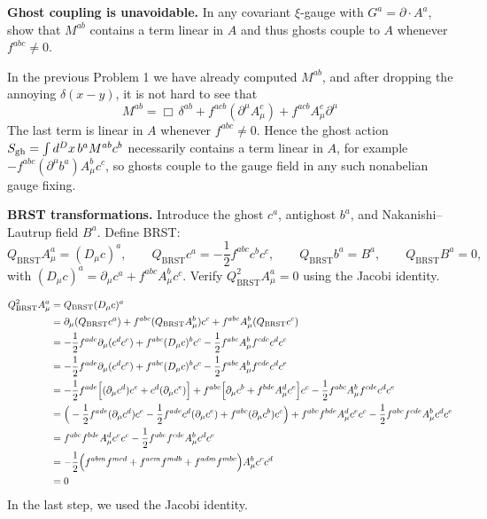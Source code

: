 \begin{problem}
    \textbf{Ghost coupling is unavoidable.} In any covariant \(\xi\)-gauge with \(G^a=\partial\cdot A^a\), show that \(M^{ab}\) contains a term linear in \(A\) and thus ghosts couple to \(A\) whenever \(f^{abc}\neq 0\).
\end{problem}
\begin{solution}[35.3]
	In the previous Problem 1 we have already computed $M^{ab}$, and after dropping the annoying $\delta(x-y)$, it is not hard to see that
	\[
		\boxed{
		M^{ab}
		= \Box\,\delta^{ab} + f^{acb}(\partial^\mu A_\mu^c) + f^{acb}A_\mu^c\partial^\mu }
	\]
	The last term is linear in $A$ whenever $f^{abc}\neq 0$.
	Hence the ghost action
	$S_{\rm gh}=\int d^Dx\, b^a M^{ab}c^b$
	necessarily contains a term linear in $A$, for example
	$-f^{abc}(\partial^\mu b^a)A_\mu^b c^c$,
	so ghosts couple to the gauge field in any such nonabelian gauge fixing.
\end{solution}
\begin{problem}
    \textbf{BRST transformations.} Introduce the ghost \(c^a\), antighost \(b^a\), and Nakanishi–Lautrup field \(B^a\). Define BRST:
    \[
        Q_{\text{BRST}}A_\mu^a=(D_\mu c)^a,\qquad
        Q_{\text{BRST}}c^a=-\frac{1}{2}f^{abc}c^b c^c,\qquad
        Q_{\text{BRST}}b^a=B^a,\qquad
        Q_{\text{BRST}}B^a=0,
    \]
    with \((D_\mu c)^a=\partial_\mu c^a+f^{abc}A_\mu^b c^c\). Verify \(Q_{\text{BRST}}^2A_\mu^a=0\) using the Jacobi identity.
\end{problem}
\begin{solution}[35.4]
\[
\begin{aligned}
	Q_{\rm BRST}^2 A_\mu^a
	&= Q_{\rm BRST}(D_\mu c)^a \\
	&= \partial_\mu(Q_{\rm BRST}c^a)
	+ f^{abc}(Q_{\rm BRST}A_\mu^b)c^c
	+ f^{abc}A_\mu^b(Q_{\rm BRST}c^c) \\
	&= -\frac12 f^{ade}\partial_\mu(c^d c^e)
	+ f^{abc}(D_\mu c)^b c^c
	-\frac12 f^{abc}A_\mu^b f^{cde}c^d c^e \\
	&=-\frac{1}{2}f^{ade}\partial_{\mu}(c^{d}c^{e})+f^{abc}(D_{\mu}c)^{b}c^{c}-\frac{1}{2}f^{abc}A_{\mu}^{b}f^{cde}c^{d}c^{e} \\
	&=-\frac{1}{2}f^{ade}\Big[(\partial_{\mu}c^{d})c^{e}+c^{d}(\partial_{\mu}c^{e})\Big]
	+f^{abc}\Big[\partial_{\mu}c^{b}+f^{bde}A_{\mu}^{d}c^{e}\Big]c^{c}
	-\frac{1}{2}f^{abc}A_{\mu}^{b}f^{cde}c^{d}c^{e} \\
	&=\Big(-\frac{1}{2}f^{ade}(\partial_{\mu}c^{d})c^{e}-\frac{1}{2}f^{ade}c^{d}(\partial_{\mu}c^{e})+f^{abc}(\partial_{\mu}c^{b})c^{c}\Big)
	+f^{abc}f^{bde}A_{\mu}^{d}c^{e}c^{c}
	-\frac{1}{2}f^{abc}f^{cde}A_{\mu}^{b}c^{d}c^{e} \\
	&=f^{abc}f^{bde}A_{\mu}^{d}c^{e}c^{c}-\frac{1}{2}f^{abc}f^{cde}A_{\mu}^{b}c^{d}c^{e} \\
	&=-\frac{1}{2}\Big(f^{abm}f^{mcd}+f^{acm}f^{mdb}+f^{adm}f^{mbc}\Big)A_{\mu}^{b}c^{c}c^{d} \\
	&=0
\end{aligned}
\]
In the last step, we used the Jacobi identity.
\end{solution}
